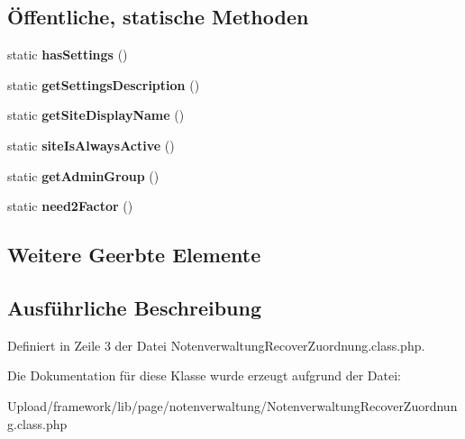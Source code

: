 \subsection*{Öffentliche, statische Methoden}
\begin{DoxyCompactItemize}
\item 
\mbox{\label{class_notenverwaltung_recover_zuordnung_adb82d4cfe341750550c4c844d2ff38e8}} 
static {\bfseries has\+Settings} ()
\item 
\mbox{\label{class_notenverwaltung_recover_zuordnung_abb3c5b7748e1f76be523baada17052d7}} 
static {\bfseries get\+Settings\+Description} ()
\item 
\mbox{\label{class_notenverwaltung_recover_zuordnung_a148e3c5832f479efebbce3400a2e3d93}} 
static {\bfseries get\+Site\+Display\+Name} ()
\item 
\mbox{\label{class_notenverwaltung_recover_zuordnung_af7243827cc1b03d3385cb0575baefa4c}} 
static {\bfseries site\+Is\+Always\+Active} ()
\item 
\mbox{\label{class_notenverwaltung_recover_zuordnung_af7f11db06e9bd8d9cddac4be7e254337}} 
static {\bfseries get\+Admin\+Group} ()
\item 
\mbox{\label{class_notenverwaltung_recover_zuordnung_abc70347c90c09925306d7eff978740dc}} 
static {\bfseries need2\+Factor} ()
\end{DoxyCompactItemize}
\subsection*{Weitere Geerbte Elemente}


\subsection{Ausführliche Beschreibung}


Definiert in Zeile 3 der Datei Notenverwaltung\+Recover\+Zuordnung.\+class.\+php.



Die Dokumentation für diese Klasse wurde erzeugt aufgrund der Datei\+:\begin{DoxyCompactItemize}
\item 
Upload/framework/lib/page/notenverwaltung/Notenverwaltung\+Recover\+Zuordnung.\+class.\+php\end{DoxyCompactItemize}
